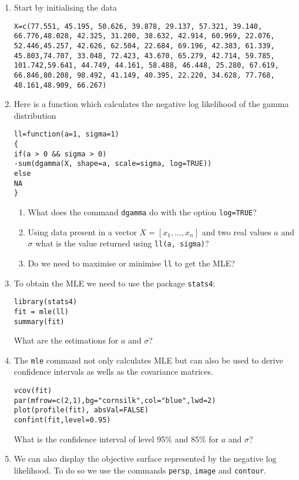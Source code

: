 \documentclass[a4paper,10pt]{article}
\begin{document}
\begin{enumerate} 
 \item Start by initialising the data 
\begin{lstlisting}
X=c(77.551, 45.195, 50.626, 39.878, 29.137, 57.321, 39.140, 
66.776,48.028, 42.325, 31.200, 38.632, 42.914, 60.969, 22.076, 
52.446,45.257, 42.626, 62.504, 22.684, 69.196, 42.383, 61.339, 
45.803,74.707, 33.048, 72.423, 43.670, 65.279, 42.714, 59.785, 
101.742,59.641, 44.749, 44.161, 58.488, 46.448, 25.280, 67.619, 
66.846,80.208, 98.492, 41.149, 40.395, 22.220, 34.628, 77.768, 
48.161,48.909, 66.267)
\end{lstlisting}
\item Here is a function which calculates the negative log likelihood of the gamma distribution

\begin{lstlisting}
ll=function(a=1, sigma=1)
{
if(a > 0 && sigma > 0)
-sum(dgamma(X, shape=a, scale=sigma, log=TRUE))
else
NA
}
\end{lstlisting}
\begin{enumerate}
\item What does the command \texttt{dgamma} do with the option \texttt{log=TRUE}? 
\item Using data present in a vector $X = [x_1, \ldots, x_n]$ and two real values $a$ and $\sigma$ what is the value returned using \texttt{ll(a, sigma)}?
\item Do we need to maximise or minimise \texttt{ll} to get the MLE? 
\end{enumerate}
\item To obtain the MLE we need to use the package \texttt{stats4}: 
\begin{lstlisting}
library(stats4)
fit = mle(ll)
summary(fit)
\end{lstlisting}
What are the estimations for $a$ and $\sigma$? 
\item The \texttt{mle} command not only calculates MLE but can also be used to derive confidence intervals as wells as the covariance matrices. 
\begin{lstlisting}
vcov(fit)
par(mfrow=c(2,1),bg="cornsilk",col="blue",lwd=2)
plot(profile(fit), absVal=FALSE)
confint(fit,level=0.95)
\end{lstlisting}
What is the confidence interval of level 95\% and 85\% for $a$ and $\sigma$? 
\item We can also display the objective surface represented by the negative log likelihood. To do so we use the commands \texttt{persp}, \texttt{image} and \texttt{contour}. 


\end{enumerate}
\end{document}
